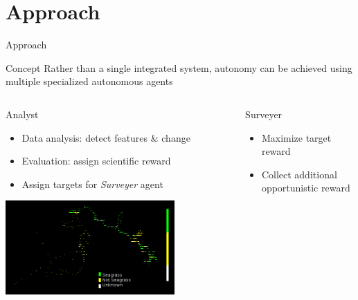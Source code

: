 \documentclass[9pt]{beamer}
\begin{document}
\section{Approach}

\begin{frame}{Approach} \label{A:concept}
    \begin{block}{Concept}
        Rather than a single integrated system, autonomy can be achieved using multiple specialized autonomous agents
    \end{block}
    \begin{columns}
        \begin{column}{0.33\textwidth}
            \begin{block}{Analyst}
                \begin{center}
                    \begin{itemize}
    	                \item Data analysis: detect features \& change
        	            \item Evaluation: assign scientific reward
                        \item Assign targets for \textit{Surveyer} agent
                    \end{itemize}
                    \includegraphics[width=0.75\textwidth,trim={6cm .5cm 4cm .5cm},clip]{img/seagrass.png}
                \end{center}
            \end{block}
        \end{column}
        \begin{column}{0.33\textwidth}
            \begin{block}{Surveyer}
                \begin{center}
                    \begin{itemize}
    	                \item Maximize target reward
        	            \item Collect additional opportunistic reward

\end{itemize}
\end{center}
\end{block}
\end{column}
\end{columns}
\end{frame}
\end{document}
